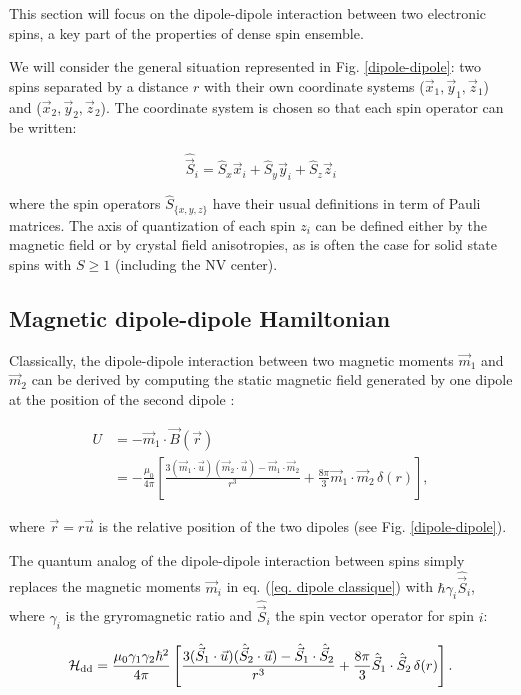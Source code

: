 \documentclass[a4paper, 11pt]{report}
\begin{document}
This section will focus on the dipole-dipole interaction between two electronic spins, a key part of the properties of dense spin ensemble. 

We will consider the general situation represented in Fig. \ref{dipole-dipole}: two spins separated by a distance $r$ with their own coordinate systems ($\vec{x}_1,\vec{y}_1,\vec{z}_1$) and ($\vec{x}_2,\vec{y}_2,\vec{z}_2$). The coordinate system is chosen so that each spin operator can be written:

\begin{equation}
\hat{\vec{S}}_i=\hat{S}_x \vec{x}_i + \hat{S}_y \vec{y}_i + \hat{S}_z \vec{z}_i
\end{equation}

where the spin operators $\hat S_{\{x,y,z\} }$ have their usual definitions in term of Pauli matrices. The axis of quantization of each spin $z_i$ can be defined either by the magnetic field or by crystal field anisotropies, as is often the case for solid state spins with $S\geq 1$ (including the NV center). 

\subsection{Magnetic dipole-dipole Hamiltonian}

Classically, the dipole-dipole interaction between two magnetic moments $\vec{m}_1$ and $\vec{m}_2$ can be derived by computing the static magnetic field generated by one dipole at the position of the second dipole \cite[p.~188]{jackson1999classical}:

\begin{align}
U&=-\vec{m}_1 \cdot \vec{B}(\vec{r}) \nonumber \\
&=-\frac{\mu_0}{4 \pi}\left[ \frac{3 (\vec{m}_1\cdot\vec{u})(\vec{m}_2\cdot\vec{u}) - \vec{m}_1\cdot\vec{m}_2}{r^3}+\frac{8\pi}{3}\vec{m}_1\cdot\vec{m}_2\,\delta(r)\right], \label{eq. dipole classique}
\end{align}

where $\vec{r}=r \vec{u}$ is the relative position of the two dipoles (see Fig. \ref{dipole-dipole}). 

The quantum analog of the dipole-dipole interaction between spins simply replaces the magnetic moments $\vec{m}_i$ in eq. (\ref{eq. dipole classique}) with $\hbar \gamma_i \hat{\vec{S}}_i$, where $\gamma_i$ is the gryromagnetic ratio and $\hat{\vec{S}}_i$ the spin vector operator for spin $i$:

\begin{equation}
\label{eq. dipole quantique J coupling}
\mathcal{H}_{\rm dd}=\frac{\mu_0 \gamma_1 \gamma_2 \hbar^2}{4 \pi}\left[ \frac{3 (\hat{\vec{S}}_1\cdot\vec{u})(\hat{\vec{S}}_2\cdot\vec{u}) - \hat{\vec{S}}_1\cdot\hat{\vec{S}}_2}{r^3}+\frac{8\pi}{3}\hat{\vec{S}}_1\cdot\hat{\vec{S}}_2\,\delta(r)\right].
\end{equation}
\end{document}
